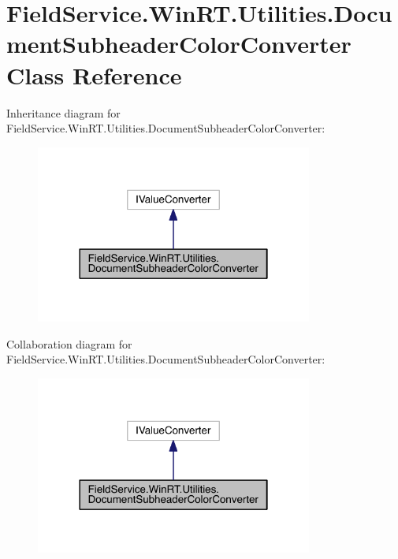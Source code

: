 \hypertarget{class_field_service_1_1_win_r_t_1_1_utilities_1_1_document_subheader_color_converter}{\section{Field\+Service.\+Win\+R\+T.\+Utilities.\+Document\+Subheader\+Color\+Converter Class Reference}
\label{class_field_service_1_1_win_r_t_1_1_utilities_1_1_document_subheader_color_converter}
}


Inheritance diagram for Field\+Service.\+Win\+R\+T.\+Utilities.\+Document\+Subheader\+Color\+Converter\+:
\nopagebreak
\begin{figure}[H]
\begin{center}
\leavevmode
\includegraphics[width=258pt]{class_field_service_1_1_win_r_t_1_1_utilities_1_1_document_subheader_color_converter__inherit__graph}
\end{center}
\end{figure}


Collaboration diagram for Field\+Service.\+Win\+R\+T.\+Utilities.\+Document\+Subheader\+Color\+Converter\+:
\nopagebreak
\begin{figure}[H]
\begin{center}
\leavevmode
\includegraphics[width=258pt]{class_field_service_1_1_win_r_t_1_1_utilities_1_1_document_subheader_color_converter__coll__graph}
\end{center}
\end{figure}

